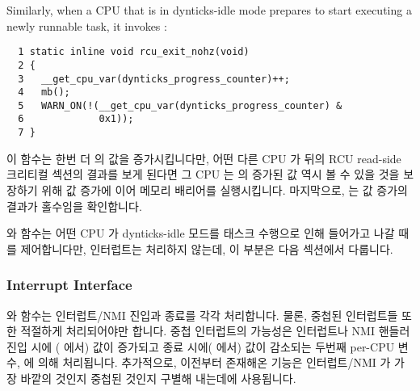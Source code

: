 Similarly, when a CPU that is in dynticks-idle mode prepares to
start executing a newly runnable task, it invokes
:
\fi

{ \scriptsize
\begin{verbatim}
  1 static inline void rcu_exit_nohz(void)
  2 {
  3   __get_cpu_var(dynticks_progress_counter)++;
  4   mb();
  5   WARN_ON(!(__get_cpu_var(dynticks_progress_counter) &
  6             0x1));
  7 }
\end{verbatim}
}

이 함수는 한번 더  의 값을 증가시킵니다만, 어떤
다른 CPU 가 뒤의 RCU read-side 크리티컬 섹션의 결과를 보게 된다면 그 CPU 는
 의 증가된 값 역시 볼 수 있을 것을 보장하기 위해
값 증가에 이어 메모리 배리어를 실행시킵니다.
마지막으로,  는 값 증가의 결과가 홀수임을 확인합니다.

 와  함수는 어떤 CPU 가 dynticks-idle
모드를 태스크 수행으로 인해 들어가고 나갈 때를 제어합니다만, 인터럽트는
처리하지 않는데, 이 부분은 다음 섹션에서 다룹니다.
\iffalse

This function again increments \co{dynticks_progress_counter},
but follows it with a memory barrier to ensure that if any other CPU
sees the result of any subsequent RCU read-side critical section,
then that other CPU will also see the incremented value of
\co{dynticks_progress_counter}.
Finally, \co{rcu_exit_nohz()} checks that the result of the
increment is an odd value.

The \co{rcu_enter_nohz()} and \co{rcu_exit_nohz()}
functions handle the case where a CPU enters and exits dynticks-idle
mode due to task execution, but does not handle interrupts, which are
covered in the following section.
\fi

\subsubsection{Interrupt Interface}
\label{sec:formal:Interrupt Interface}

 와  함수는 인터럽트/NMI 진입과 종료를
각각 처리합니다.
물론, 중첩된 인터럽트들 또한 적절하게 처리되어야만 합니다.
중첩 인터럽트의 가능성은 인터럽트나 NMI 핸들러 진입 시에 (
에서) 값이 증가되고 종료 시에( 에서) 값이 감소되는 두번째
per-CPU 변수,  에 의해 처리됩니다.
추가적으로, 이전부터 존재해온  기능은 인터럽트/NMI 가 가장
바깥의 것인지 중첩된 것인지 구별해 내는데에 사용됩니다.

